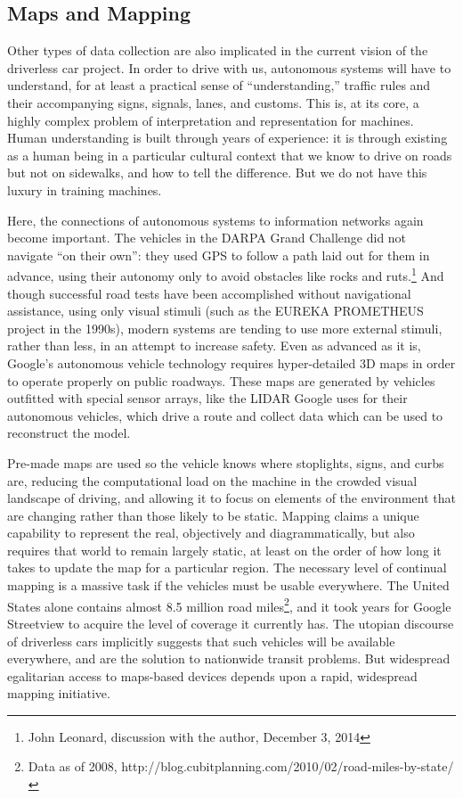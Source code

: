 \subsection{Maps and Mapping}

Other types of data collection are also implicated in the current
vision of the driverless car project. In order to drive with us,
autonomous systems will have to understand,
for at least a practical sense of “understanding,” traffic rules and
their accompanying signs, signals, lanes, and customs. This is, at its
core, a highly complex problem of interpretation and representation
for machines. Human understanding is built
through years of experience: it is through existing as a human being
in a particular cultural context that we know to drive on roads but
not on sidewalks, and how to tell the difference. But we do not have
this luxury in training machines.

Here, the connections of autonomous systems to information networks
again become important. The vehicles in the
DARPA Grand Challenge did not navigate “on their own”: they used GPS
to follow a path laid out for them in advance, using their autonomy
only to avoid obstacles like rocks and ruts.\footnote{John Leonard,
  discussion with the author, December 3, 2014} And though successful
road tests have been accomplished without navigational assistance,
using only visual stimuli (such as the EUREKA PROMETHEUS project
in the 1990s)\cite{???}, modern systems are tending to use more external
stimuli, rather than less, in an attempt to increase safety. Even as
advanced as it is, Google's autonomous vehicle technology requires
hyper-detailed 3D maps in order to operate properly on public
roadways.\cite{???} These maps are generated by vehicles outfitted with
special sensor arrays, like the LIDAR Google uses for their autonomous
vehicles, which drive a route and collect data which can be used to
reconstruct the model.\cite{???}

Pre-made maps are used so the vehicle knows where stoplights, signs,
and curbs are, reducing the computational load on the machine in the
crowded visual landscape of driving, and allowing it to focus on
elements of the environment that are changing rather than those likely
to be static.\cite{???} Mapping claims a unique capability to represent the real, objectively
and diagrammatically, but also requires that world to remain largely
static, at least on the order of how long it takes to update the map
for a particular region. The necessary level of continual mapping is a massive task if the
vehicles must be usable everywhere. The United States alone contains almost
8.5 million road miles\footnote{Data as of 2008,
  http://blog.cubitplanning.com/2010/02/road-miles-by-state/\cite{???}},
and it took years for Google Streetview to acquire the level of
coverage it currently has. The utopian discourse of driverless cars
implicitly suggests that such vehicles will be available everywhere,
and are the solution to nationwide transit problems. But widespread
egalitarian access to maps-based devices depends upon a rapid,
widespread mapping initiative.

